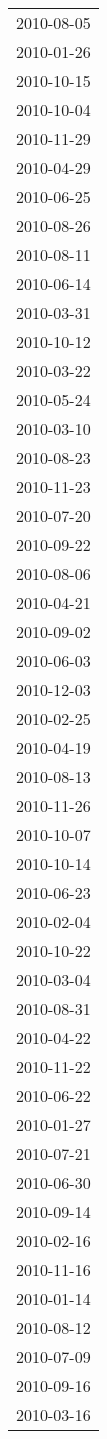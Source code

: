 \begin{tabular}{l}
2010-08-05 \\
2010-01-26 \\
2010-10-15 \\
2010-10-04 \\
2010-11-29 \\
2010-04-29 \\
2010-06-25 \\
2010-08-26 \\
2010-08-11 \\
2010-06-14 \\
2010-03-31 \\
2010-10-12 \\
2010-03-22 \\
2010-05-24 \\
2010-03-10 \\
2010-08-23 \\
2010-11-23 \\
2010-07-20 \\
2010-09-22 \\
2010-08-06 \\
2010-04-21 \\
2010-09-02 \\
2010-06-03 \\
2010-12-03 \\
2010-02-25 \\
2010-04-19 \\
2010-08-13 \\
2010-11-26 \\
2010-10-07 \\
2010-10-14 \\
2010-06-23 \\
2010-02-04 \\
2010-10-22 \\
2010-03-04 \\
2010-08-31 \\
2010-04-22 \\
2010-11-22 \\
2010-06-22 \\
2010-01-27 \\
2010-07-21 \\
2010-06-30 \\
2010-09-14 \\
2010-02-16 \\
2010-11-16 \\
2010-01-14 \\
2010-08-12 \\
2010-07-09 \\
2010-09-16 \\
2010-03-16 \\

\end{tabular}
